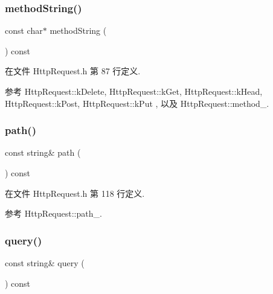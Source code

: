 \subsubsection{\texorpdfstring{method\+String()}{methodString()}}
{\footnotesize\ttfamily const char$\ast$ method\+String (\begin{DoxyParamCaption}{ }\end{DoxyParamCaption}) const\hspace{0.3cm}{\ttfamily [inline]}}



在文件 Http\+Request.\+h 第 87 行定义.



参考 Http\+Request\+::k\+Delete, Http\+Request\+::k\+Get, Http\+Request\+::k\+Head, Http\+Request\+::k\+Post, Http\+Request\+::k\+Put , 以及 Http\+Request\+::method\+\_\+.

\mbox{\label{classmuduo_1_1net_1_1HttpRequest_a2fb105290147c32827e9d649026f6fd9}} 
\subsubsection{\texorpdfstring{path()}{path()}}
{\footnotesize\ttfamily const string\& path (\begin{DoxyParamCaption}{ }\end{DoxyParamCaption}) const\hspace{0.3cm}{\ttfamily [inline]}}



在文件 Http\+Request.\+h 第 118 行定义.



参考 Http\+Request\+::path\+\_\+.

\mbox{\label{classmuduo_1_1net_1_1HttpRequest_a992fd038e5a6f55177f482d011569b84}} 
\subsubsection{\texorpdfstring{query()}{query()}}
{\footnotesize\ttfamily const string\& query (\begin{DoxyParamCaption}{ }\end{DoxyParamCaption}) const\hspace{0.3cm}{\ttfamily [inline]}}



